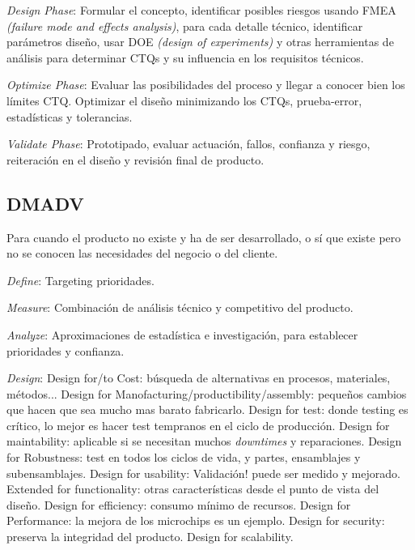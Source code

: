 \documentclass[]{article}
\begin{document}
\textit{Design Phase}: Formular el concepto, identificar posibles riesgos usando FMEA \textit{(failure mode and effects analysis)}, para cada detalle técnico, identificar parámetros diseño, usar DOE \textit{(design of experiments)} y otras herramientas de análisis para determinar CTQs y su influencia en los requisitos técnicos.

\textit{Optimize Phase}: Evaluar las posibilidades del proceso y llegar a conocer bien los límites CTQ. Optimizar el diseño minimizando los CTQs, prueba-error, estadísticas y tolerancias.

\textit{Validate Phase}: Prototipado, evaluar actuación, fallos, confianza y riesgo, reiteración en el diseño y revisión final de producto.

\subsection{DMADV} Para cuando el producto no existe y ha de ser desarrollado, o sí que existe pero no se conocen las necesidades del negocio o del cliente. 

\textit{Define}: Targeting prioridades.

\textit{Measure}: Combinación de análisis técnico y competitivo del producto. 

\textit{Analyze}: Aproximaciones de estadística e investigación, para establecer prioridades y confianza.

\textit{Design}: \newline Design for/to Cost: búsqueda de alternativas en procesos, materiales, métodos... \newline Design for Manofacturing/productibility/assembly: pequeños cambios que hacen que sea mucho mas barato fabricarlo. \newline Design for test: donde testing es crítico, lo mejor es hacer test tempranos en el ciclo de producción. \newline Design for maintability: aplicable si se necesitan muchos \textit{downtimes} y reparaciones. \newline Design for Robustness: test en todos los ciclos de vida, y partes, ensamblajes y subensamblajes. \newline Design for usability: Validación! puede ser medido y mejorado. Extended for functionality: otras características desde el punto de vista del diseño. \newline Design for efficiency: consumo mínimo de recursos. \newline Design for Performance: la mejora de los microchips es un ejemplo. \newline Design for security: preserva la integridad del producto. Design for scalability.
\end{document}
